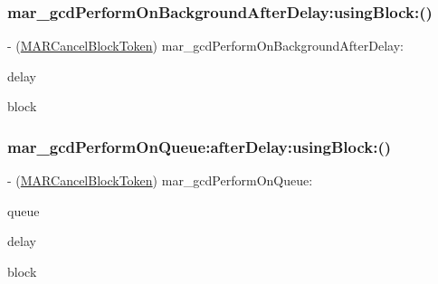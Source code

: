 \subsubsection{\texorpdfstring{mar\+\_\+gcd\+Perform\+On\+Background\+After\+Delay\+:using\+Block\+:()}{mar\_gcdPerformOnBackgroundAfterDelay:usingBlock:()}\hspace{0.1cm}{\footnotesize\ttfamily [3/3]}}
{\footnotesize\ttfamily -\/ (\hyperlink{_n_s_object_09_m_a_r_e_x_8h_aefb8384298417c24573cc88fde04d1a7}{M\+A\+R\+Cancel\+Block\+Token}) mar\+\_\+gcd\+Perform\+On\+Background\+After\+Delay\+: \begin{DoxyParamCaption}\item[{(N\+S\+Time\+Interval)}]{delay }\item[{usingBlock:(void($^\wedge$)(id))}]{block }\end{DoxyParamCaption}\hspace{0.3cm}{\ttfamily [implementation]}}

\mbox{\label{category_n_s_object_07_m_a_r_e_x___g_c_d_08_a4da3963ae7c8ca1a453ec86dc3a5b20e}} 
\subsubsection{\texorpdfstring{mar\+\_\+gcd\+Perform\+On\+Queue\+:after\+Delay\+:using\+Block\+:()}{mar\_gcdPerformOnQueue:afterDelay:usingBlock:()}\hspace{0.1cm}{\footnotesize\ttfamily [1/3]}}
{\footnotesize\ttfamily -\/ (\hyperlink{_n_s_object_09_m_a_r_e_x_8h_aefb8384298417c24573cc88fde04d1a7}{M\+A\+R\+Cancel\+Block\+Token}) mar\+\_\+gcd\+Perform\+On\+Queue\+: \begin{DoxyParamCaption}\item[{(dispatch\+\_\+queue\+\_\+t)}]{queue }\item[{afterDelay:(N\+S\+Time\+Interval)}]{delay }\item[{usingBlock:(void($^\wedge$)(id obj\+Self))}]{block }\end{DoxyParamCaption}}

